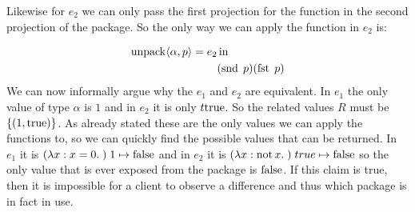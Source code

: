 Likewise for $e_2$ we can only pass the first projection for the function in the second projection of the package. So the only way we can apply the function in  $e_2$ is:

\begin{align*}
  \operatorname{unpack} \langle \alpha,p \rangle = e_2 & \operatorname{in} \\
  & (\operatorname{snd} \; p)(\operatorname{fst} \; p)
\end{align*}
We can now informally argue why the $e_1$ and $e_2$ are equivalent. In $e_1$ the only value of type $\alpha$ is $1$ and in $e_2$ it is only $t\text{true}$. So the related values $R$ must be $\{(1,\text{true})\}$. As  already stated these are the only values we can apply the functions to, so we can quickly find the possible values that can be returned. In $e_1$ it is $(\lambda x : x=0 . \; )\; 1 \mapsto \text{false}$ and in $e_2$ it is $(\lambda x : \operatorname{not} x  . \; )\; true \mapsto \text{false}$ so the only value that is ever exposed from the package is $\text{false}$. If this claim is true, then it is impossible for a client to observe a difference and thus which package is in fact in use. 

